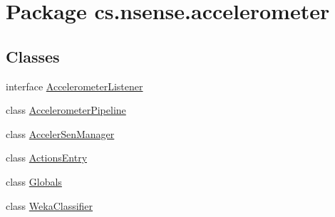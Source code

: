 \hypertarget{namespacecs_1_1nsense_1_1accelerometer}{\section{Package cs.\-nsense.\-accelerometer}
\label{namespacecs_1_1nsense_1_1accelerometer}
}
\subsection*{Classes}
\begin{DoxyCompactItemize}
\item 
interface \hyperlink{interfacecs_1_1nsense_1_1accelerometer_1_1_accelerometer_listener}{Accelerometer\-Listener}
\item 
class \hyperlink{classcs_1_1nsense_1_1accelerometer_1_1_accelerometer_pipeline}{Accelerometer\-Pipeline}
\item 
class \hyperlink{classcs_1_1nsense_1_1accelerometer_1_1_acceler_sen_manager}{Acceler\-Sen\-Manager}
\item 
class \hyperlink{classcs_1_1nsense_1_1accelerometer_1_1_actions_entry}{Actions\-Entry}
\item 
class \hyperlink{classcs_1_1nsense_1_1accelerometer_1_1_globals}{Globals}
\item 
class \hyperlink{classcs_1_1nsense_1_1accelerometer_1_1_weka_classifier}{Weka\-Classifier}
\end{DoxyCompactItemize}


